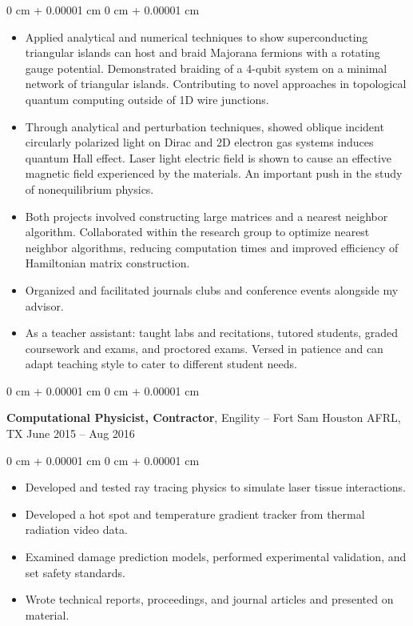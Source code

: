 \documentclass[10pt, letterpaper]{article}
\newenvironment{highlights}{
    \begin{itemize}[
        topsep=0.10 cm,
        parsep=0.10 cm,
        partopsep=0pt,
        itemsep=0pt,
        leftmargin=0 cm + 10pt
    ]
}{
    \end{itemize}
} %
\newenvironment{onecolentry}{
    \begin{adjustwidth}{
        0 cm + 0.00001 cm
    }{
        0 cm + 0.00001 cm
    }
}{
    \end{adjustwidth}
} %
\newenvironment{twocolentry}[2][]{
    \onecolentry
    \def\secondColumn{#2}
    \setcolumnwidth{\fill, 4.5 cm}
    \begin{paracol}{2}
}{
    \switchcolumn \raggedleft \secondColumn
    \end{paracol}
    \endonecolentry
} %
\begin{document}
        \vspace{0.10 cm}
        \begin{onecolentry}
            \begin{highlights}
            \item Applied analytical and numerical techniques to show superconducting triangular islands can host and braid Majorana fermions with a rotating gauge potential. Demonstrated braiding of a 4-qubit system on a minimal network of triangular islands. Contributing to novel approaches in topological quantum computing outside of 1D wire junctions.
            \item Through analytical and perturbation techniques, showed oblique incident circularly polarized light on Dirac and 2D electron gas systems induces quantum Hall effect. Laser light electric field is shown to cause an effective magnetic field experienced by the materials. An important push in the study of nonequilibrium physics.
            \item Both projects involved constructing large matrices and a nearest neighbor algorithm. Collaborated within the research group to optimize nearest neighbor algorithms, reducing computation times and improved efficiency of Hamiltonian matrix construction.
            \item Organized and facilitated journals clubs and conference events alongside my advisor.
            \item As a teacher assistant: taught labs and recitations, tutored students, graded coursework and exams, and proctored exams. Versed in patience and can adapt teaching style to cater to different student needs.
            \end{highlights}
        \end{onecolentry}

        \vspace{0.2 cm}

        \begin{twocolentry}{
            June 2015 – Aug 2016
        }
      \textbf{Computational Physicist, Contractor}, Engility -- Fort Sam Houston AFRL, TX\end{twocolentry}

        \vspace{0.10 cm}
        \begin{onecolentry}
            \begin{highlights}
              \item Developed and tested ray tracing physics to simulate laser tissue interactions.
              \item Developed a hot spot and temperature gradient tracker from thermal radiation video data.
              \item Examined damage prediction models, performed experimental validation, and set safety standards.
              \item Wrote technical reports, proceedings, and journal articles and presented on material.
            \end{highlights}
        \end{onecolentry}
\end{document}
